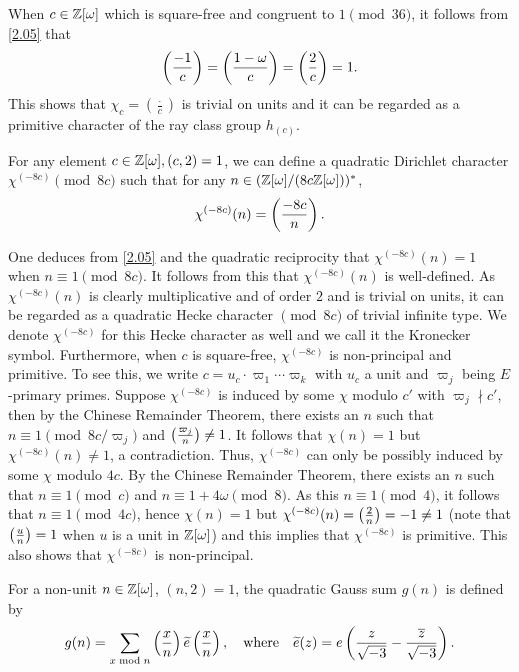 \documentclass[twoside,leqno,10pt, A4]{amsart}
\begin{document}
When $c \in \mathbb Z[\omega]$ which is square-free and congruent to $1 \pmod {36}$, it follows from \eqref{2.05} that
\begin{align}
\label{2.5}
  \left(\frac{-1}{c}\right)=\left(\frac{1-\omega}{c}\right)=\left(\frac{2}{c}\right)=1.
\end{align}
This shows that $\chi_c =(\frac {\cdot}{c})$ is trivial on units and it can be regarded as a primitive character of the ray class group $h_{(c)}$. \newline

 For any element $c \in \mathbb Z[\omega], (c, 2)=1$, we can define a quadratic Dirichlet character $\chi^{(-8c)} \pmod {8c}$ such that for any $n \in (\mathbb Z[\omega]/(8c\mathbb Z[\omega]))^*$,
\begin{align*}
   \chi^{(-8c)}(n)=\left(\frac{-8c}{n}\right).
\end{align*}

    One deduces from \eqref{2.05} and the quadratic reciprocity that  $\chi^{(-8c)}(n)=1$ when $n \equiv 1 \pmod {8c}$. It follows from this that  $\chi^{(-8c)}(n)$ is well-defined. As $\chi^{(-8c)}(n)$ is clearly multiplicative and of order $2$ and is trivial on units, it can be regarded as a quadratic Hecke character $\pmod {8c}$ of trivial infinite type. We denote $\chi^{(-8c)}$ for this Hecke character as well and we call it the Kronecker symbol. Furthermore, when $c$ is square-free, $\chi^{(-8c)}$ is non-principal and primitive. To see this, we write $c=u_c \cdot \varpi_1 \cdots \varpi_k$ with $u_c$ a unit and $\varpi_j$  being $E$-primary primes. Suppose $\chi^{(-8c)}$ is induced by some $\chi$ modulo $c'$ with $\varpi_j \nmid c'$, then by the Chinese Remainder Theorem, there exists an $n$ such that $n \equiv 1 \pmod {8c/\varpi_j}$ and $\left(\frac{\varpi_j}{n}\right) \neq 1$. It follows that $\chi(n)=1$ but $\chi^{(-8c)}(n) \neq 1$, a contradiction. Thus, $\chi^{(-8c)}$ can only be possibly induced by some $\chi$ modulo $4c$. By the Chinese Remainder Theorem, there exists an $n$ such that $n \equiv 1 \pmod {c}$ and $n \equiv 1+4\omega \pmod {8}$. As this $n \equiv 1 \pmod {4}$, it follows that $n \equiv 1 \pmod {4c}$, hence $\chi(n)=1$ but $\chi^{(-8c)}(n)=\left(\frac{2}{n}\right)=-1 \neq 1$ (note that $\left(\frac{u}{n}\right)=1$ when $u$ is a unit in $\mathbb Z[\omega]$) and this implies that $\chi^{(-8c)}$ is primitive. This also shows that $\chi^{(-8c)}$ is non-principal. \newline

For a non-unit $n \in \mathbb Z[\omega]$, $(n,2)=1$, the quadratic Gauss sum $g(n)$ is defined by
\[    g(n) =\sum_{x \bmod{n}} \left(\frac{x}{n}\right) \widetilde{e}\left(\frac{x}{n}\right) , \quad \mbox{where} \quad \widetilde{e}(z) =e \left( \frac {z}{\sqrt{-3}} - \frac {\overline{z}}{\sqrt{-3}} \right). \]
\end{document}
